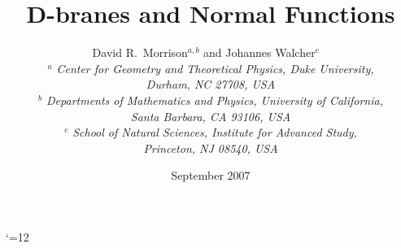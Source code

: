 
\def\Hom{{\rm Hom}}
\def\U{{\it U}}
\def\GL{{\it GL}}
\def\Ker{{\rm Ker}}
\def\Im{{\rm Im}}
\def\Coker{{\rm Coker}}
\def\II{\cali}
\def\VV{\calv}
\def\HH{\mathfrak{H}}
\def\CC{\mathfrak{C}}

\def\cc{\mathfrak{c}}
\def\gg{\mathfrak{g}}
\def\kk{\mathfrak{k}}
\def\hh{\mathfrak{h}}
\def\mm{\mathfrak{m}}

\def\CP{\complex\projective}
\def\RP{\reals\projective}

\def\str{{\mathop{\rm Str}}}
\def\eps{\epsilon}

\def\DD{{\bf D}}          %
\def\MCM{{\rm MCM}}       %
\def\free{{\rm DG}}       %
\def\mf{{\rm MF}}          %
\def\MF{{\rm MF}}    %

\def\fuk{{\rm Fuk}}
\def\om{\omega}

\def\ch{{\rm ch}}
\def\td{{\rm Td}}

\def\Ip{\mathord{\mathchar "0271}}
\def\Ipp{\mathord{\mathchar "0271 \kern-4.5pt \mathchar"0271}}

\def\TT{{\mathbb T}}
\def\aut{\mathop{\rm Aut}}
\def\End{\mathop{\rm End}}

\def\eul{{\bf e}}

\def\res{{\rm Res}}
\def\AJ{\mathop{\it AJ}}
\def\CH{\mathop{\rm CH}}

\def\calrloc{\calr_{\mathfrak m}}
\def\tcalrloc{{\tilde\calr}_{\mathfrak m}}



\catcode`\@=12 

 


\title{D-branes and Normal Functions}

\date{September 2007}

\author{
David R.~Morrison$^{a,b}$ and Johannes Walcher$^{c}$ \ \\[0.4cm]
\it $^a$ Center for Geometry and Theoretical Physics, Duke University, \\
\it Durham, NC 27708, USA\\[0.2cm]
\it $^b$ Departments of Mathematics and Physics, University of California,\\
\it Santa Barbara, CA 93106, USA \\[0.2cm]
\it $^c$ School of Natural Sciences, Institute for Advanced Study,\\
\it Princeton, NJ 08540, USA}


